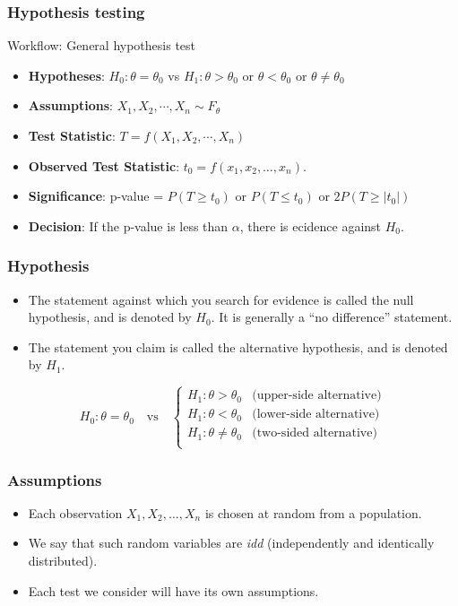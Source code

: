 \documentclass[a4paper]{article}\usepackage[]{graphicx}\usepackage[]{xcolor}
\begin{document}
\subsubsection{Hypothesis testing}
\begin{redbox}{Workflow: General hypothesis test}
	\begin{itemize}
		\item \textbf{Hypotheses}: \( H_0: \theta = \theta_0 \) vs \( H_1: \theta > \theta_0 \) or \( \theta < \theta_0 \) or \( \theta \neq \theta_0 \)
		\item \textbf{Assumptions}: \( X_1,X_2,\dotsb,X_n \sim F_\theta \)
		\item \textbf{Test Statistic}: \( T = f(X_1,X_2,\dotsb,X_n) \)  
		\item \textbf{Observed Test Statistic}: \( t_0 = f(x_1,x_2,\dotsc,x_n) \).
		\item \textbf{Significance}: p-value = \( P(T \geq t_0) \) or \( P(T \leq t_0) \) or \( 2P(T \geq \lvert t_0 \rvert) \)
		\item \textbf{Decision}:  If the p-value is less than \( \alpha \), there is ecidence against \( H_0 \).
	\end{itemize}
\end{redbox}
\subsubsection{Hypothesis}
\begin{itemize}
	\item The statement against which you search for evidence is called the null hypothesis, and is denoted by \( H_0 \). It is generally a ``no difference'' statement.
	\item The statement you claim is called the alternative hypothesis, and is denoted by \( H_1 \).
\end{itemize}
\[
	H_0: \theta = \theta_0 \quad\text{vs}\quad
	\begin{cases}
		H_1: \theta > \theta_0 &\text{(upper-side alternative)} \\
		H_1: \theta < \theta_0 &\text{(lower-side alternative)} \\
		H_1: \theta \neq \theta_0 &\text{(two-sided alternative)} \\
	\end{cases}
\]
\subsubsection{Assumptions}
\begin{itemize}
	\item Each observation \( X_1,X_2,\dotsc,X_n \) is chosen at random from a population.
	\item We say that such random variables are \textit{idd} (independently and identically distributed).
	\item Each test we consider will have its own assumptions.
\end{itemize}
\end{document}
